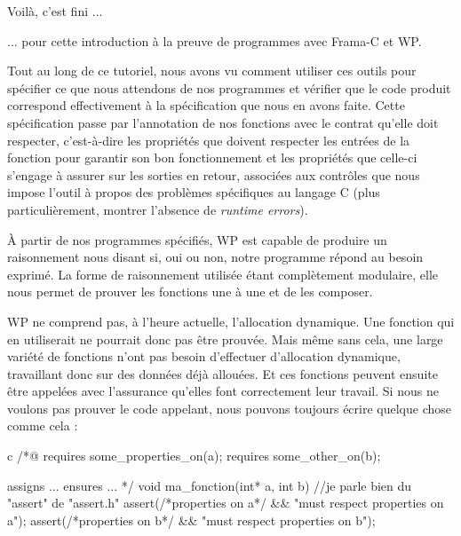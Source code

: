 \begin{Quotation}
Voilà, c'est fini ...
\end{Quotation}



... pour cette introduction à la preuve de programmes avec Frama-C et WP.



Tout au long de ce tutoriel, nous avons vu comment utiliser ces outils
pour spécifier ce que nous attendons de nos programmes et vérifier que le code
produit correspond effectivement à la spécification que nous en
avons faite. Cette spécification passe par l'annotation de nos fonctions avec
le contrat qu'elle doit respecter, c'est-à-dire les propriétés que doivent
respecter les entrées de la fonction pour garantir son bon fonctionnement et
les propriétés que celle-ci s'engage à assurer sur les sorties en retour,
associées aux contrôles que nous impose l'outil à propos des problèmes
spécifiques au langage C (plus particulièrement, montrer l'absence de
\textit{runtime errors}).



À partir de nos programmes spécifiés, WP est capable de produire un
raisonnement nous disant si, oui ou non, notre programme répond au besoin
exprimé. La forme de raisonnement utilisée étant complètement modulaire, elle
nous permet de prouver les fonctions une à une et de les composer.

WP ne  comprend pas, à l'heure actuelle, l'allocation dynamique. Une fonction
qui en  utiliserait ne pourrait donc pas être prouvée. Mais même sans cela,
une large variété de fonctions n'ont pas besoin
d'effectuer d'allocation dynamique, travaillant donc sur des données déjà
allouées. Et ces fonctions peuvent ensuite être appelées avec l'assurance
qu'elles font correctement leur travail. Si nous ne voulons pas prouver le
code appelant, nous pouvons toujours écrire quelque chose comme cela :



\begin{CodeBlock}{c}
/*@
  requires some_properties_on(a);
  requires some_other_on(b);

  assigns ...
  ensures ...
*/
void ma_fonction(int* a, int b){
  //je parle bien du "assert" de "assert.h"
  assert(/*properties on a*/ && "must respect properties on a");
  assert(/*properties on b*/ && "must respect properties on b");
}
\end{CodeBlock}



